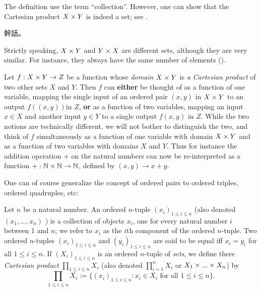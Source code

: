 \begin{remark} \label{remark 3.5.5}
The definition use the term ``collection''.
However, one can show that the Cartesian product \(X \times Y\) is indeed a set; see .
\end{remark}

\begin{example}
幹話。
\end{example}

Strictly speaking, \(X \times Y\) and \(Y \times X\) are different sets, although they are very similar.
For instance, they always have the same number of elements ().

Let \(f : X \times Y \rightarrow Z\) be a function whose \emph{domain \(X \times Y\)} is \emph{a Cartesian product} of two other sets \(X\) and \(Y\).
Then \(f\) can \textbf{either} be thought of as a function of one variable, mapping the single input of an ordered pair \((x, y)\) in \(X \times Y\) to an output \(f( (x, y) )\)in \(Z\),
\textbf{or} as a function of two variables, mapping an input \(x \in X\) and another input \(y \in Y\) to a single output \(f(x, y)\) in \(Z\).
While the two notions are technically different, we will not bother to distinguish the two,
and think of \(f\) simultaneously as a function of one variable with domain \(X \times Y\)
and as a function of two variables with domains \(X\) and \(Y\).
Thus for instance the addition operation \(+\) on the natural numbers can now be re-interpreted as a function \(+ : \mathbb{N} \times \mathbb{N} \rightarrow \mathbb{N}\), defined by \((x, y) \rightarrow x + y\).

One can of course generalize the concept of ordered pairs to ordered
triples, ordered quadruples, etc:

\begin{definition}  \label{def 3.5.7}
Let \(n\) be a natural number.
An ordered \(n\)-tuple \((x_i)_{1 \leq i \leq n} \) (also denoted \( (x_1, ..., x_n) \) ) is a collection of objects \(x_i\),
one for every natural number \(i\) between \(1\) and \(n\);
we refer to \(x_i\) as the \(i\)th component of the ordered \(n\)-tuple.
Two ordered \(n\)-tuples \((x_i)_{1 \leq i \le n}\) and \((y_i)_{1 \leq i \leq n}\) are said to be equal iff \(x_i = y_i\) for all \(1 \leq i \le n\).
If \((X_i)_{1 \leq i \leq n}\) is an ordered \(n\)-tuple of \emph{sets}, we define there \emph{Cartesian product} \(\prod_{1 \leq i \leq n}X_i\) (also denoted \(\prod_{i=1}^{n}X_i\) or \(X_1 \times ... \times X_n\)) by
\[
    \prod_{1 \leq i \leq n} X_i := \{ (x_i)_{1 \leq i \leq n} : x_i \in X_i \text{\ for all \(1 \leq i \leq n\)} \}.
\]
\end{definition}

